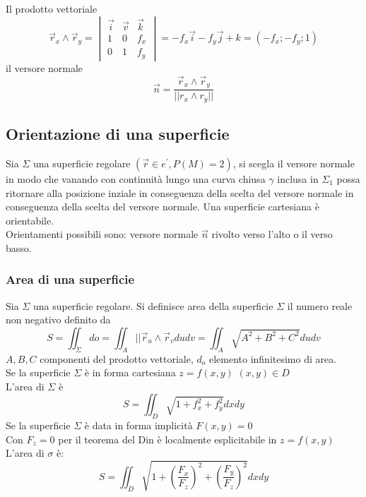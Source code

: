 Il prodotto vettoriale 
\begin{equation*}
	\vec{r}_x\wedge \vec{r}_y=\begin{vmatrix}
		\vec{i} & \vec{v} &\vec{k}\\
		1 & 0 & f_x\\
		0 & 1 &f_y
	\end{vmatrix}=-f_x\vec{i}-f_y\vec{j}+k=(-f_x;-f_y;1)
\end{equation*}
il versore normale
\begin{equation*}
	\vec{n}=\frac{\vec{r}_x\wedge \vec{r}_y}{||r_x\wedge r_y||}
\end{equation*}
\subsection{Orientazione di una superficie}
Sia $\Sigma$ una superficie regolare $(\vec{r}\in e^\prime, P(M)=2)$, si
scegla il versore normale in modo che vanando con continuità lungo una curva
chiusa $\gamma$ inclusa in $\Sigma_1$ possa ritornare alla posizione inziale in
conseguenza della scelta del versore normale in conseguenza della scelta del
versore normale. Una superficie cartesiana è orientabile.\\
Orientamenti possibili sono: versore normale $\vec{n}$ rivolto verso l'alto o
il verso basso. 
\subsubsection{Area di una superficie}
Sia $\Sigma$ una superficie regolare. Si definisce {\color{red}area della
superficie} $\Sigma$ il numero reale non negativo definito da
\begin{equation*}
	S=\iint_\Sigma d o = \iint_A||\vec{r}_u\wedge
	\vec{r}_vdudv=\iint_A\sqrt{A^2+B^2+C^2}dudv
\end{equation*}
$A,B,C$ componenti del prodotto vettoriale, $d_o$ elemento infinitesimo di
area.\\
Se la superficie $\Sigma$ è in forma cartesiana $z=f(x,y)$ $(x,y)\in D$\\
L'area di $\Sigma$ è
\begin{equation*}
	S=\iint_D \sqrt{1+f_x^2+f_y^2} dxdy
\end{equation*}
Se la superficie $\Sigma$ è data in forma implicità $F(x,y)=0$\\
Con $F_z=0$ per il teorema del Din è localmente esplicitabile in $z=f(x,y)$\\
L'area di $\sigma$ è:
\begin{equation*}
	S=\iint_D\sqrt{1+\left(\frac{F_x}{F_z}\right)^2+\left(\frac{F_y}{F_z}\right)^2}dxdy
\end{equation*}

